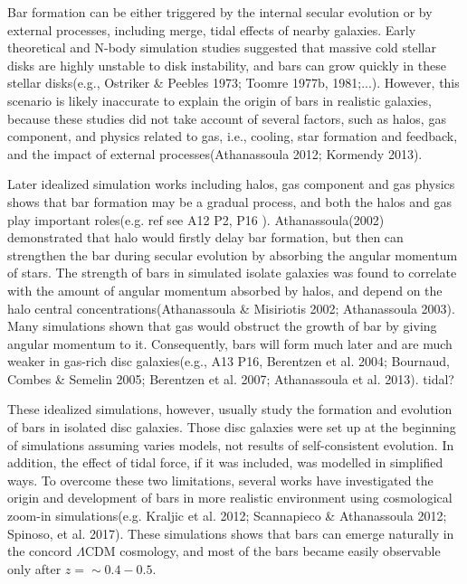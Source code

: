 Bar formation can be either triggered by the internal secular evolution or by external processes, including merge, tidal effects of nearby galaxies. Early theoretical and N-body simulation studies suggested that massive cold stellar disks are highly unstable to disk instability, and bars can grow quickly in these stellar disks(e.g., Ostriker \& Peebles 1973; Toomre 1977b, 1981;...). However, this scenario is likely inaccurate to explain the origin of bars in realistic galaxies, because these studies did not take account of several factors, such as halos, gas component, and physics related to gas, i.e., cooling, star formation and feedback, and the impact of external processes(Athanassoula 2012; Kormendy 2013).  

Later idealized simulation works including halos, gas component and gas physics shows that bar formation may be a gradual process, and both the halos and gas play important roles(e.g. ref see A12 P2, P16 ). Athanassoula(2002) demonstrated that halo would firstly delay bar formation, but then can strengthen the bar during secular evolution by absorbing the angular momentum of stars. The strength of bars in simulated isolate galaxies was found to correlate with the amount of angular momentum absorbed by halos, and depend on the halo central concentrations(Athanassoula \& Misiriotis 2002; Athanassoula 2003). Many simulations shown that gas would obstruct the growth of bar by giving angular momentum to it. Consequently, bars will form much later and are much weaker in gas-rich disc galaxies(e.g., A13 P16, Berentzen et al. 2004; Bournaud, Combes \& Semelin 2005; Berentzen et al. 2007; Athanassoula et al. 2013). tidal? 

These idealized simulations, however, usually study the formation and evolution of bars in isolated disc galaxies. Those disc galaxies were set up at the beginning of simulations assuming varies models, not results of self-consistent evolution. In addition, the effect of tidal force,  if it was included, was modelled in simplified ways. To overcome these two limitations, several works have investigated the origin and development of bars in more realistic environment using cosmological zoom-in simulations(e.g. Kraljic et al. 2012; Scannapieco \& Athanassoula 2012; Spinoso, et al. 2017). These simulations shows that bars can emerge naturally in the concord $\Lambda$CDM cosmology, and most of the bars became easily observable only after $z=\sim 0.4-0.5$.

